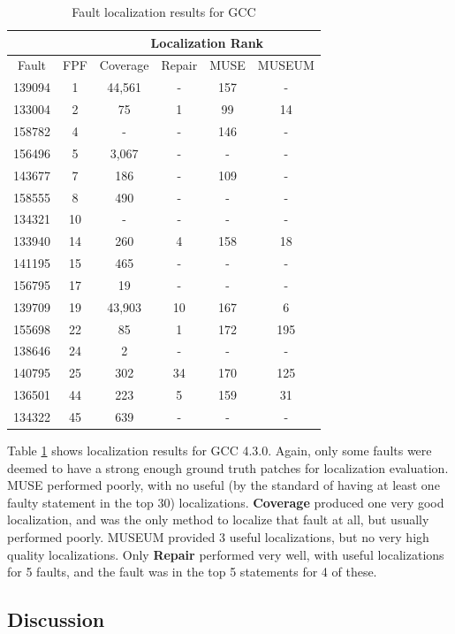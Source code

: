 \begin{table}
\centering
{\scriptsize
\begin{tabular}{|c||c||c|c|c|c|}
\hline
& & \multicolumn{4}{|c|}{Localization Rank} \\
\hline
Fault & FPF & Coverage & Repair & MUSE & MUSEUM \\
\hline
139094 & 1 & 44,561 & - & 157 & -\\
133004 & 2 & 75 & 1 & 99 & 14\\
158782 & 4 & - & - & 146 & -\\
156496 & 5 & 3,067 & - & - & -\\
143677 & 7 & 186 & - & 109 & -\\
158555 & 8 & 490 & - & - & -\\
134321 & 10 & - & - & - & -\\
133940 & 14 & 260 & 4 & 158 & 18\\
141195 & 15 & 465 & - & - & -\\
156795 & 17 & 19 & - & - & -\\
139709 & 19 & 43,903 & 10 & 167 & 6\\
155698 & 22 & 85 & 1 & 172 & 195\\
138646 & 24 & 2 & - & - & -\\
140795 & 25 & 302 & 34 & 170 & 125\\
136501 & 44 & 223 & 5 & 159 & 31\\
134322 & 45 & 639 & - & - & -\\
\hline
\end{tabular}
}
\caption{Fault localization results for GCC}
\label{gcctable}
\end{table}

Table \ref{gcctable} shows localization results for GCC 4.3.0.  Again, only some faults were deemed to have a strong enough ground truth patches for localization evaluation.   MUSE performed poorly, with no useful (by the standard of having at least one faulty statement in the top 30) localizations.  {\bf Coverage} produced one very good localization, and was the only method to localize that fault at all, but usually performed poorly.  MUSEUM provided 3 useful localizations, but no very high quality localizations.  Only {\bf Repair} performed very well, with useful localizations for 5 faults, and the fault was in the top 5 statements for 4 of these.

\subsection{Discussion}

